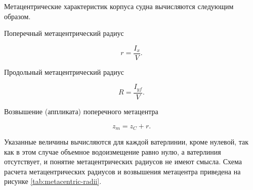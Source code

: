 Метацентрические характеристик корпуса судна вычисляются следующим образом.

Поперечный метацентрический радиус

\begin{equation}
    r = \frac{I_x}{V}.
\end{equation}

Продольный метацентрический радиус

\begin{equation}
    R = \frac{I_{yf}}{V}.
\end{equation}

Возвышение (аппликата) поперечного метацентра

\begin{equation}
    z_m = z_C + r.
\end{equation}

Указанные величины вычисляются для каждой ватерлинии, кроме нулевой, так как в этом случае объемное водоизмещение равно нулю, а ватерлиния отсутствует, и понятие метацентрических радиусов не имеют смысла.
Схема расчета метацентрических радиусов и возвышения метацентра приведена на рисунке \ref{tab:metacentric-radii}.

